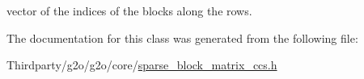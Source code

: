 vector of the indices of the blocks along the rows. 



The documentation for this class was generated from the following file\+:\begin{DoxyCompactItemize}
\item 
Thirdparty/g2o/g2o/core/\mbox{\hyperlink{sparse__block__matrix__ccs_8h}{sparse\+\_\+block\+\_\+matrix\+\_\+ccs.\+h}}\end{DoxyCompactItemize}
